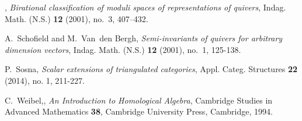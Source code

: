 \documentclass{amsart}
\numberwithin{equation}{section}
\theoremstyle{definition}
\theoremstyle{remark}
\begin{document}
\begin{thebibliography}{10}
\bysame, \emph{Birational classification of moduli spaces of representations of
  quivers}, Indag. Math. (N.S.) \textbf{12} (2001), no.~3, 407--432.

A.~Schofield and M.~Van~den Bergh, \emph{Semi-invariants of quivers for
  arbitrary dimension vectors}, Indag. Math. (N.S.) \textbf{12} (2001), no.~1,
  125-138. 

P.~Sosna, \emph{Scalar extensions of triangulated categories}, Appl. Categ. Structures \textbf{22} (2014), no. 1, 211-227.

C.~Weibel,, {\em An Introduction to Homological Algebra}, Cambridge Studies in Advanced Mathematics \textbf{38}, Cambridge University Press, Cambridge, 1994. 

\end{thebibliography}
\end{document}
